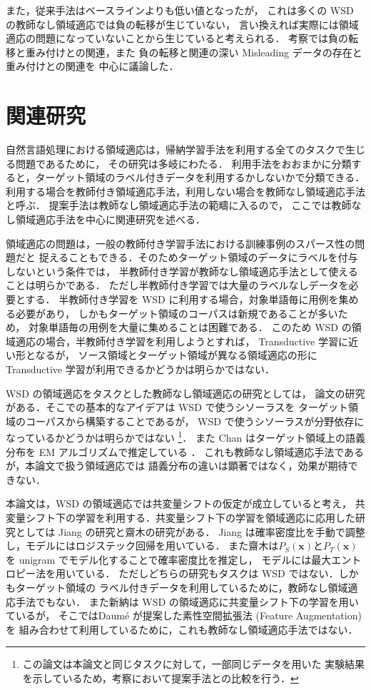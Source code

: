 \documentclass[japanese]{jnlp_1.4}
\begin{document}
また，従来手法はベースラインよりも低い値となったが，
これは多くの WSD の教師なし領域適応では負の転移が生じていない，
言い換えれば実際には領域適応の問題になっていないことから生じていると考えられる．
考察では負の転移と重み付けとの関連，また
負の転移と関連の深い Misleading データの存在と重み付けとの関連を
中心に議論した．


\section{関連研究}


自然言語処理における領域適応は，帰納学習手法を利用する全てのタスクで生じる問題であるために，
その研究は多岐にわたる．
利用手法をおおまかに分類すると，ターゲット領域のラベル付きデータを利用するかしないかで分類できる．
利用する場合を教師付き領域適応手法，利用しない場合を教師なし領域適応手法と呼ぶ．
提案手法は教師なし領域適応手法の範疇に入るので，
ここでは教師なし領域適応手法を中心に関連研究を述べる．

領域適応の問題は，一般の教師付き学習手法における訓練事例のスパース性の問題だと
捉えることもできる．そのためターゲット領域のデータにラベルを付与しないという条件では，
半教師付き学習\cite{chapelle2006semi}が教師なし領域適応手法として使えることは明らかである．
ただし半教師付き学習では大量のラベルなしデータを必要とする．
半教師付き学習を WSD に利用する場合，対象単語毎に用例を集める必要があり，
しかもターゲット領域のコーパスは新規であることが多いため，
対象単語毎の用例を大量に集めることは困難である．
このため WSD の領域適応の場合，半教師付き学習を利用しようとすれば，
Transductive 学習\cite{joachims1999transductive}に近い形となるが，
ソース領域とターゲット領域が異なる領域適応の形に 
Transductive 学習が利用できるかどうかは明らかではない．

WSD の領域適応をタスクとした教師なし領域適応の研究としては，
論文\cite{shinnou-gengo-13}の研究がある．そこでの基本的なアイデアは WSD で使うシソーラスを
ターゲット領域のコーパスから構築することであるが，
WSD で使うシソーラスが分野依存になっているかどうかは明らかではない\cite{shinnou-jws5}
\footnote{この論文\cite{shinnou-gengo-13}は本論文と同じタスクに対して，一部同じデータを用いた
実験結果を示しているため，考察において提案手法との比較を行う．}．
また Chan はターゲット領域上の語義分布を EM アルゴリズムで推定している
\cite{chan2005word,chan2006estimating}．
これも教師なし領域適応手法であるが，本論文で扱う領域適応では
語義分布の違いは顕著ではなく，効果が期待できない．

本論文は，WSD の領域適応では共変量シフトの仮定が成立していると考え，
共変量シフト下の学習を利用する．共変量シフト下の学習を領域適応に応用した研究としては
Jiang の研究\cite{jiang2007instance}と齋木の研究\cite{saiki-2008-03-27}がある．
Jiang は確率密度比を手動で調整し，モデルにはロジステック回帰を用いている．
また齋木は$P_S({\bm x})$と$P_T({\bm x})$を unigram でモデル化することで確率密度比を推定し，
モデルには最大エントロピー法を用いている．
ただしどちらの研究もタスクは WSD ではない．しかもターゲット領域の
ラベル付きデータを利用しているために，教師なし領域適応手法でもない．
また新納は WSD の領域適応に共変量シフト下の学習を用いているが\cite{shinnou-gengo-14}，
そこではDaum{\'e} が提案した素性空間拡張法 (Feature Augmentation)\cite{daume0}を
組み合わせて利用しているために，これも教師なし領域適応手法ではない．
\end{document}
